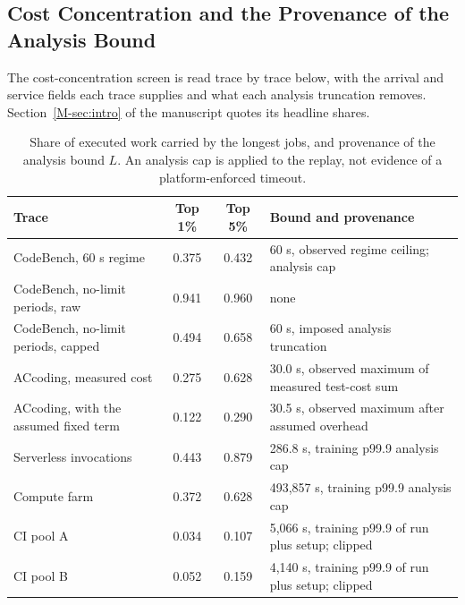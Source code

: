 \documentclass[mathematics,supfile,submit,moreauthors]{Definitions/mdpi}
\newcommand{\devnum}[1]{#1}
\begin{document}
\subsection{Cost Concentration and the Provenance of the Analysis Bound}
\label{sec:supp_tails}

The cost-concentration screen is read trace by trace below, with the arrival and service
fields each trace supplies and what each analysis truncation removes. Section~\ref*{M-sec:intro}
of the manuscript quotes its headline shares.

\begin{table}[htbp]
\centering
\caption{Share of executed work carried by the longest jobs, and provenance of the
analysis bound $L$. An analysis cap is applied to the replay, not evidence of a
platform-enforced timeout.}
\label{tab:s_tails}
\small
\begin{tabular}{lccp{}}
\hline
Trace & Top \devnum{1\%} & Top \devnum{5\%} & Bound and provenance \\
\hline
CodeBench, \devnum{60} s regime & \devnum{0.375} & \devnum{0.432} & \devnum{60} s, observed regime ceiling; analysis cap \\
CodeBench, no-limit periods, raw & \devnum{0.941} & \devnum{0.960} & none \\
CodeBench, no-limit periods, capped & \devnum{0.494} & \devnum{0.658} & \devnum{60} s, imposed analysis truncation \\
ACcoding, measured cost & \devnum{0.275} & \devnum{0.628} & \devnum{30.0} s, observed maximum of measured test-cost sum \\
ACcoding, with the assumed fixed term & \devnum{0.122} & \devnum{0.290} & \devnum{30.5} s, observed maximum after assumed overhead \\
Serverless invocations & \devnum{0.443} & \devnum{0.879} & \devnum{286.8} s, training p99.9 analysis cap \\
Compute farm & \devnum{0.372} & \devnum{0.628} & \devnum{493{,}857} s, training p99.9 analysis cap \\
CI pool A & \devnum{0.034} & \devnum{0.107} & \devnum{5{,}066} s, training p99.9 of run plus setup; clipped \\
CI pool B & \devnum{0.052} & \devnum{0.159} & \devnum{4{,}140} s, training p99.9 of run plus setup; clipped \\
\hline
\end{tabular}
\end{table}
\end{document}
